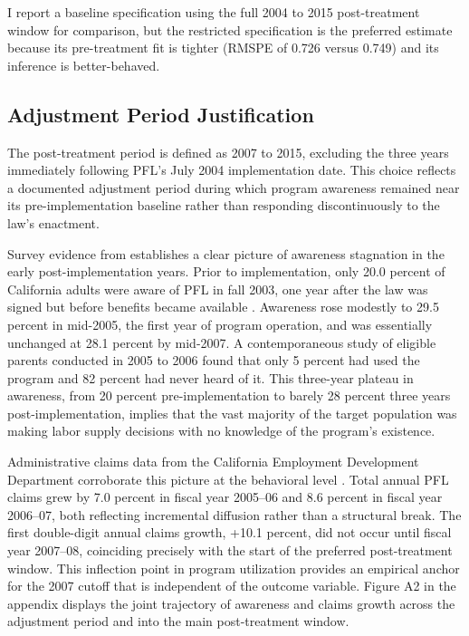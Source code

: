 \documentclass[12pt, letterpaper]{article}
\begin{document}
I report a baseline specification using the full 2004 to 2015 post-treatment window for comparison, but the restricted specification is the preferred estimate because its pre-treatment fit is tighter (RMSPE of 0.726 versus 0.749) and its inference is better-behaved.

\subsection{Adjustment Period Justification}

The post-treatment period is defined as 2007 to 2015, excluding the three years immediately following PFL's July 2004 implementation date. This choice reflects a documented adjustment period during which program awareness remained near its pre-implementation baseline rather than responding discontinuously to the law's enactment.

Survey evidence from \citet{appelbaum2011} establishes a clear picture of awareness stagnation in the early post-implementation years. Prior to implementation, only 20.0 percent of California adults were aware of PFL in fall 2003, one year after the law was signed but before benefits became available \citep[Golden Bear Omnibus Survey, $n = 1{,}050$]{appelbaum2011}. Awareness rose modestly to 29.5 percent in mid-2005, the first year of program operation, and was essentially unchanged at 28.1 percent by mid-2007. A contemporaneous study of eligible parents conducted in 2005 to 2006 found that only 5 percent had used the program and 82 percent had never heard of it. This three-year plateau in awareness, from 20 percent pre-implementation to barely 28 percent three years post-implementation, implies that the vast majority of the target population was making labor supply decisions with no knowledge of the program's existence.

Administrative claims data from the California Employment Development Department corroborate this picture at the behavioral level \citep{edd2014}. Total annual PFL claims grew by 7.0 percent in fiscal year 2005--06 and 8.6 percent in fiscal year 2006--07, both reflecting incremental diffusion rather than a structural break. The first double-digit annual claims growth, +10.1 percent, did not occur until fiscal year 2007--08, coinciding precisely with the start of the preferred post-treatment window. This inflection point in program utilization provides an empirical 
anchor for the 2007 cutoff that is independent of the outcome variable. Figure A2 in the appendix displays the joint trajectory of awareness and claims growth across the adjustment period and into the main post-treatment window.
\end{document}
